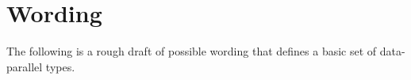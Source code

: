 \section{Wording}

The following is a rough draft of possible wording that defines a basic set of data-parallel types.

\begin{wgText}
  
  
  
\end{wgText}

